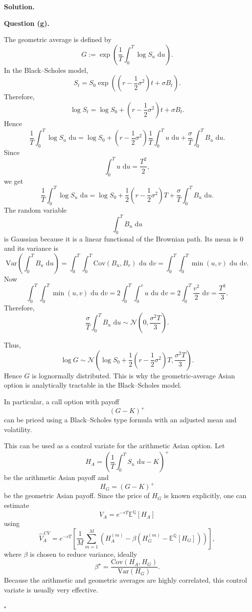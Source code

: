 \documentclass[11pt]{article}
\theoremstyle{plain}
\newcommand{\E}{\mathbb{E}}
\newcommand{\dd}{\,\mathrm{d}}
\newcommand{\1}{\mathbf{1}}
\newcommand{\Var}{\mathrm{Var}}
\newcommand{\Cov}{\mathrm{Cov}}
\theoremstyle{definition}
\newenvironment{solution}
{\par\medskip\noindent\textbf{Solution.}\par\medskip}
{\hfill$\square$\par\medskip}
\newenvironment{solutionpart}[1]
{\par\medskip\noindent\textbf{#1.}\par\smallskip}
{\par\medskip}
\begin{document}
\begin{solution}
\begin{solutionpart}{Question (g)}
The geometric average is defined by
\[
G
:=
\exp\left(
\frac1T\int_0^T \log S_u\,\dd u
\right).
\]
In the Black--Scholes model,
\[
S_t
=
S_0
\exp\left(
\left(r-\frac12\sigma^2\right)t+\sigma B_t
\right).
\]
Therefore,
\[
\log S_t
=
\log S_0
+
\left(r-\frac12\sigma^2\right)t
+
\sigma B_t.
\]
Hence
\[
\frac1T\int_0^T \log S_u\,\dd u
=
\log S_0
+
\left(r-\frac12\sigma^2\right)\frac{1}{T}\int_0^T u\,\dd u
+
\frac{\sigma}{T}\int_0^T B_u\,\dd u.
\]
Since
\[
\int_0^T u\,\dd u=\frac{T^2}{2},
\]
we get
\[
\frac1T\int_0^T \log S_u\,\dd u
=
\log S_0
+
\frac12\left(r-\frac12\sigma^2\right)T
+
\frac{\sigma}{T}\int_0^T B_u\,\dd u.
\]
The random variable
\[
\int_0^T B_u\,\dd u
\]
is Gaussian because it is a linear functional of the Brownian path. Its mean is $0$ and its variance is
\[
\Var\left(\int_0^T B_u\,\dd u\right)
=
\int_0^T\int_0^T \Cov(B_u,B_v)\,\dd u\,\dd v
=
\int_0^T\int_0^T \min(u,v)\,\dd u\,\dd v.
\]
Now
\[
\int_0^T\int_0^T \min(u,v)\,\dd u\,\dd v
=
2\int_0^T\int_0^v u\,\dd u\,\dd v
=
2\int_0^T \frac{v^2}{2}\,\dd v
=
\frac{T^3}{3}.
\]
Therefore,
\[
\frac{\sigma}{T}\int_0^T B_u\,\dd u
\sim
\mathcal{N}\left(0,\frac{\sigma^2T}{3}\right).
\]

Thus,
\[
\log G
\sim
\mathcal{N}\left(
\log S_0+\frac12\left(r-\frac12\sigma^2\right)T,
\frac{\sigma^2T}{3}
\right).
\]
Hence $G$ is lognormally distributed. This is why the geometric-average Asian option is analytically tractable in the Black--Scholes model.

In particular, a call option with payoff
\[
(G-K)^+
\]
can be priced using a Black--Scholes type formula with an adjusted mean and volatility.

This can be used as a control variate for the arithmetic Asian option. Let
\[
H_A
=
\left(
\frac1T\int_0^T S_u\,\dd u-K
\right)^+
\]
be the arithmetic Asian payoff and
\[
H_G=(G-K)^+
\]
be the geometric Asian payoff. Since the price of $H_G$ is known explicitly, one can estimate
\[
V_A
=
e^{-rT}\E^\mathbb{Q}[H_A]
\]
using
\[
\widehat V_A^{\,CV}
=
e^{-rT}
\left[
\frac1M\sum_{m=1}^M
\left(
H_A^{(m)}
-
\beta\left(H_G^{(m)}-\E^\mathbb{Q}[H_G]\right)
\right)
\right],
\]
where $\beta$ is chosen to reduce variance, ideally
\[
\beta^\star
=
\frac{\Cov(H_A,H_G)}{\Var(H_G)}.
\]
Because the arithmetic and geometric averages are highly correlated, this control variate is usually very effective.
\end{solutionpart}
\end{solution}
\end{document}
